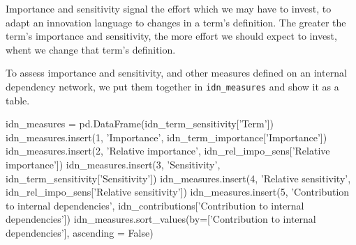 Importance and sensitivity signal the effort which we may have to invest, to adapt an innovation language to changes in a term's definition. The greater the term's importance and sensitivity, the more effort we should expect to invest, whent we change that term's definition.

To assess importance and sensitivity, and other measures defined on an internal dependency network, we put them together in \verb|idn_measures| and show it as a table.

\begin{pycode}
idn_measures = pd.DataFrame(idn_term_sensitivity['Term'])
idn_measures.insert(1, 'Importance', idn_term_importance['Importance'])
idn_measures.insert(2, 'Relative importance', idn_rel_impo_sens['Relative importance'])
idn_measures.insert(3, 'Sensitivity', idn_term_sensitivity['Sensitivity'])
idn_measures.insert(4, 'Relative sensitivity', idn_rel_impo_sens['Relative sensitivity'])
idn_measures.insert(5, 'Contribution to internal dependencies', idn_contributions['Contribution to internal dependencies'])
idn_measures.sort_values(by=['Contribution to internal dependencies'], ascending = False)
\end{pycode}

